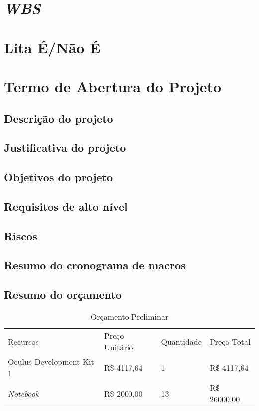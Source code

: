 \section{\textit{WBS}}

\section{Lita É/Não É}

\section{Termo de Abertura do Projeto}

\subsection{Descrição do projeto}
\subsection{Justificativa do projeto}
\subsection{Objetivos do projeto}
\subsection{Requisitos de alto nível}
\subsection{Riscos}
\subsection{Resumo do cronograma de macros}
\subsection{Resumo do orçamento}

\begin{table}[htp]
\centering
\caption{Orçamento Preliminar}
\label{orcamento-preliminar}
\begin{tabular}{llll}
Recursos                 & Preço Unitário & Quantidade & Preço Total \\
Oculus Development Kit 1 & R\$ 4117,64    & 1          & R\$ 4117,64 \\
\textit{Notebook} & R\$ 2000,00    & 13          & R\$ 26000,00 
\end{tabular}
\end{table}

